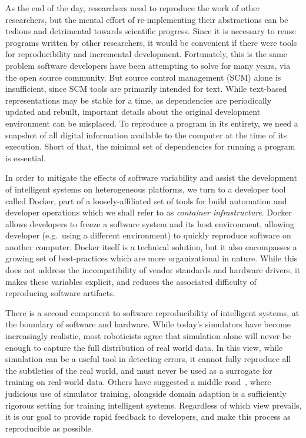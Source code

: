 \documentclass[12pt,initial,twoside,maitrise]{dms}
\numberwithin{equation}{section}
\numberwithin{table}{chapter}
\numberwithin{figure}{chapter}
\begin{document}
As the end of the day, researchers need to reproduce the work of other researchers, but the mental effort of re-implementing their abstractions can be tedious and detrimental towards scientific progress. Since it is necessary to reuse programs written by other researchers, it would be convenient if there were tools for reproducibility and incremental development. Fortunately, this is the same problem software developers have been attempting to solve for many years, via the open source community. But source control management (SCM) alone is insufficient, since SCM tools are primarily intended for text. While text-based representations may be stable for a time, as dependencies are periodically updated and rebuilt, important details about the original development environment can be misplaced. To reproduce a program in its entirety, we need a snapshot of all digital information available to the computer at the time of its execution. Short of that, the minimal set of dependencies for running a program is essential.

In order to mitigate the effects of software variability and assist the development of intelligent systems on heterogeneous platforms, we turn to a developer tool called Docker, part of a loosely-affiliated set of tools for build automation and developer operations which we shall refer to as \textit{container infrastructure}. Docker allows developers to freeze a software system and its host environment, allowing developer (e.g.~using a different environment) to quickly reproduce software on another computer. Docker itself is a technical solution, but it also encompasses a growing set of best-practices which are more organizational in nature. While this does not address the incompatibility of vendor standards and hardware drivers, it makes these variables explicit, and reduces the associated difficulty of reproducing software artifacts.

There is a second component to software reproducibility of intelligent systems, at the boundary of software and hardware. While today's simulators have become increasingly realistic, most roboticists agree that simulation alone will never be enough to capture the full distribution of real world data. In this view, while simulation can be a useful tool in detecting errors, it cannot fully reproduce all the subtleties of the real world, and must never be used as a surrogate for training on real-world data. Others have suggested a middle road~\cite{bousmalis2018using}, where judicious use of simulator training, alongside domain adaption is a sufficiently rigorous setting for training intelligent systems. Regardless of which view prevails, it is our goal to provide rapid feedback to developers, and make this process as reproducible as possible.
\end{document}
